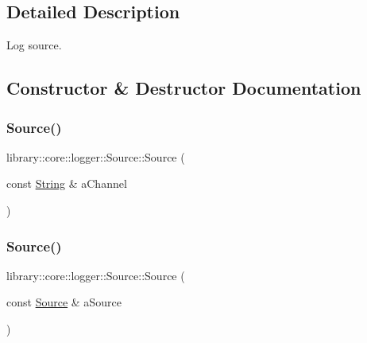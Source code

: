 \subsection{Detailed Description}
Log source. 

\subsection{Constructor \& Destructor Documentation}
\mbox{\label{classlibrary_1_1core_1_1logger_1_1_source_a2e40fbdae5f8f4dd6a075992f11a939f}} 
\subsubsection{\texorpdfstring{Source()}{Source()}\hspace{0.1cm}{\footnotesize\ttfamily [1/2]}}
{\footnotesize\ttfamily library\+::core\+::logger\+::\+Source\+::\+Source (\begin{DoxyParamCaption}\item[{const \hyperlink{classlibrary_1_1core_1_1types_1_1_string}{String} \&}]{a\+Channel }\end{DoxyParamCaption})}

\mbox{\label{classlibrary_1_1core_1_1logger_1_1_source_ae9d7e82827aa19efdd1c25d91911a9a6}} 
\subsubsection{\texorpdfstring{Source()}{Source()}\hspace{0.1cm}{\footnotesize\ttfamily [2/2]}}
{\footnotesize\ttfamily library\+::core\+::logger\+::\+Source\+::\+Source (\begin{DoxyParamCaption}\item[{const \hyperlink{classlibrary_1_1core_1_1logger_1_1_source}{Source} \&}]{a\+Source }\end{DoxyParamCaption})}



